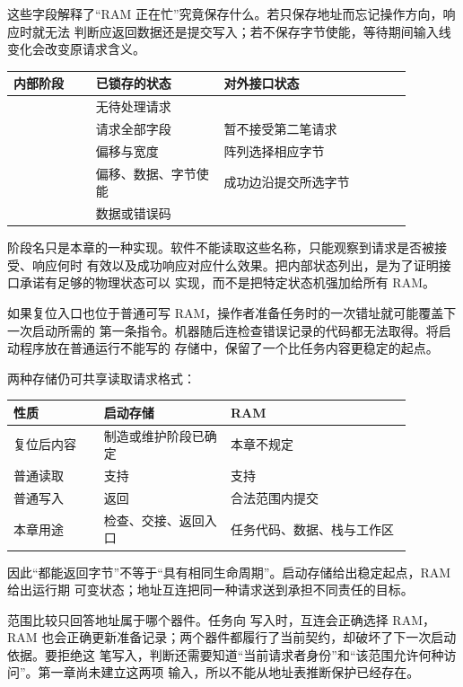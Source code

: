 这些字段解释了“RAM 正在忙”究竟保存什么。若只保存地址而忘记操作方向，响应时就无法
判断应返回数据还是提交写入；若不保存字节使能，等待期间输入线变化会改变原请求含义。

\begin{longtable}{|L{0.18\linewidth}|L{0.29\linewidth}|L{0.41\linewidth}|}
\hline
{}
内部阶段 & 已锁存的状态 & 对外接口状态 \\ \hline
{} & 无待处理请求 &  \\ \hline
{} & 请求全部字段 & 暂不接受第二笔请求 \\ \hline
{} & 偏移与宽度 & 阵列选择相应字节 \\ \hline
{} & 偏移、数据、字节使能 & 成功边沿提交所选字节 \\ \hline
{} & 数据或错误码 &  \\ \hline
\end{longtable}

阶段名只是本章的一种实现。软件不能读取这些名称，只能观察到请求是否被接受、响应何时
有效以及成功响应对应什么效果。把内部状态列出，是为了证明接口承诺有足够的物理状态可以
实现，而不是把特定状态机强加给所有 RAM。


如果复位入口也位于普通可写 RAM，操作者准备任务时的一次错址就可能覆盖下一次启动所需的
第一条指令。机器随后连检查错误记录的代码都无法取得。将启动程序放在普通运行不能写的
存储中，保留了一个比任务内容更稳定的起点。

两种存储仍可共享读取请求格式：

\begin{longtable}{|L{0.20\linewidth}|L{0.28\linewidth}|L{0.40\linewidth}|}
\hline
{}
性质 & 启动存储 & RAM \\ \hline
复位后内容 & 制造或维护阶段已确定 & 本章不规定 \\ \hline
普通读取 & 支持 & 支持 \\ \hline
普通写入 & 返回  & 合法范围内提交 \\ \hline
本章用途 & 检查、交接、返回入口 & 任务代码、数据、栈与工作区 \\ \hline
\end{longtable}

因此“都能返回字节”不等于“具有相同生命周期”。启动存储给出稳定起点，RAM 给出运行期
可变状态；地址互连把同一种请求送到承担不同责任的目标。


范围比较只回答地址属于哪个器件。任务向  写入时，互连会正确选择 RAM，
RAM 也会正确更新准备记录；两个器件都履行了当前契约，却破坏了下一次启动依据。要拒绝这
笔写入，判断还需要知道“当前请求者身份”和“该范围允许何种访问”。第一章尚未建立这两项
输入，所以不能从地址表推断保护已经存在。


